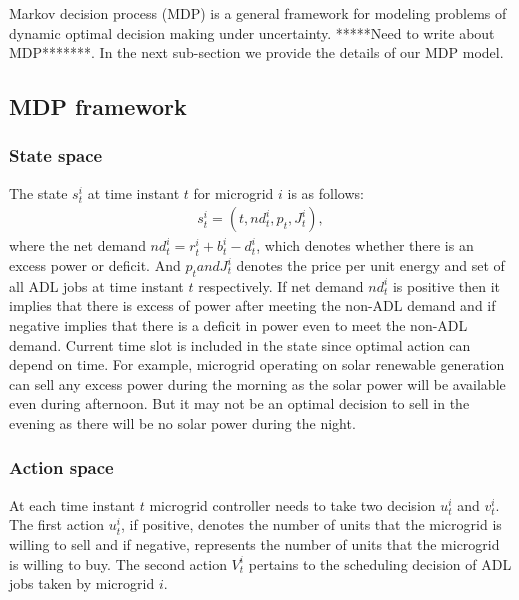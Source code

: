 Markov decision process (MDP)  is a general framework for modeling problems of dynamic optimal decision making under uncertainty. *****Need to write about MDP*******.
 In the next sub-section we provide the details of our MDP model.
\subsection{MDP framework}
\subsubsection{State space}
The state $s_{t}^{i}$ at time instant $t$  for microgrid $i$ is as follows:
\begin{align}
s_{t}^{i} = (t,nd_{t}^{i},p_{t}, J_{t}^{i}),
\end{align}
where the net demand $nd_{t}^{i} = r_{t}^{i} + b_{t}^{i} - d_{t}^{i}$, which denotes whether there is an excess power or deficit.  And $p_{t} and  J_{t}^{i}$ denotes the price per unit energy and set of all ADL jobs at time instant $t$ respectively. If  net demand $nd_{t}^{i}$ is positive then it implies that there is excess of power after meeting the non-ADL demand and if negative implies that there is a deficit in power even to meet the non-ADL demand. Current time slot is  included in the state since optimal action can depend on time. For example, microgrid operating on solar renewable generation can sell any excess power during the morning as the solar power will be available even during afternoon. But it may not be an optimal decision to sell in the evening as there will be no solar power during the night. 
\subsubsection{Action space}
At each time instant $t$ microgrid controller needs to take two decision $u_{t}^{i}$ and $v_{t}^{i}$. The first action $u_{t}^{i}$, if positive, denotes the number of units that the microgrid is willing to sell and if negative, represents the number of units that the microgrid is willing to buy. The second action $V_{t}^{i}$ pertains to the scheduling decision of ADL jobs taken by microgrid $i$.


